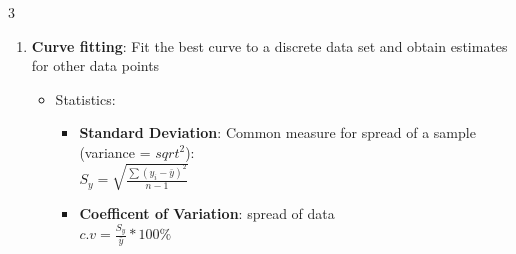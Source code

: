 \documentclass[fontsize=5pt]{scrartcl}
\begin{document}
\begin{multicols}{3}
\begin{enumerate}
\begin{itemize}
                \begin{math}
                  f_n(x)=\sum_{n}{i=0}{\ell_i(x)f(x_i)} \\
                  \ell_j(x)=\prod_{\begin{smallmatrix}0\le m\le k\\ m\neq j\end{smallmatrix}}\frac{x-x_m}{x_j-x_m}\\
                  = \frac{(x-x_0)}{(x_j-x_0)} \cdots \frac{(x-x_{j-1})}{(x_j-x_{j-1})} \frac{(x-x_{j+1})}{(x_j-x_{j+1})} \cdots \frac{(x-x_k)}{(x_j-x_k)} \\
                  \\
                  f_1(x)=\frac{x-x_1}{x_0-x_1}f(x_0)+\frac{x-x_0}{x_1-x_0}f(x_1)\\
                  f_2(x)=\frac{(x-x_1)(x-x_2)}{(x_0-x_1)(x_0-x_2)}f(x_0) \\+\frac{(x-x_0)(x-x_2)}{(x_1-x_0)(x_1-x_2)}f(x_1)}+\frac{(x-x_0)(x-x_1)}{(x_2-x_0)(x_2-x_1)}
                \end{math}
          \end{itemize}
          \item \textbf{Curve fitting}: Fit the best curve to a discrete data set and obtain estimates for other data points
          \begin{itemize}
           \item Statistics:
           \begin{itemize}
            \item \textbf{Standard Deviation}: Common measure for spread of a sample (variance = $sqrt^2$): \\
            $S_y = \sqrt{\frac{\sum(y_i-\bar{y})^2}{n-1}}$ \\
            \item \textbf{Coefficent of Variation}: spread of data \\
            $c.v=\frac{S_y}{\bar{y}}*100\%$
          \end{itemize}
          

\end{itemize}
\end{enumerate}
\end{multicols}
\end{document}
